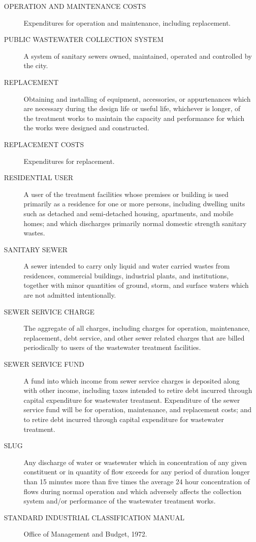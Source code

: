 \begin{description}
\item[OPERATION AND MAINTENANCE COSTS] Expenditures for operation and maintenance, including replacement.
\item[PUBLIC WASTEWATER COLLECTION SYSTEM] A system of sanitary sewers owned, maintained, operated and controlled by the city.
\item[REPLACEMENT] Obtaining and installing of equipment, accessories, or appurtenances which are necessary during the design life or useful life, whichever is longer, of the treatment works to maintain the capacity and performance for which the works were designed and constructed.
\item[REPLACEMENT COSTS] Expenditures for replacement.
\item[RESIDENTIAL USER] A user of the treatment facilities whose premises or building is used primarily as a residence for one or more persons, including dwelling units such as detached and semi-detached housing, apartments, and mobile homes; and which discharges primarily normal domestic strength sanitary wastes.
\item[SANITARY SEWER] A sewer intended to carry only liquid and water carried wastes from residences, commercial buildings, industrial plants, and institutions, together with minor quantities of ground, storm, and surface waters which are not admitted intentionally.
\item[SEWER SERVICE CHARGE] The aggregate of all charges, including charges for operation, maintenance, replacement, debt service, and other sewer related charges that are billed periodically to users of the wastewater treatment facilities.
\item[SEWER SERVICE FUND] A fund into which income from sewer service charges is deposited along with other income, including taxes intended to retire debt incurred through capital expenditure for wastewater treatment.  Expenditure of the sewer service fund will be for operation, maintenance, and replacement costs; and to retire debt incurred through capital expenditure for wastewater treatment.
\item[SLUG] Any discharge of water or wastewater which in concentration of any given constituent or in quantity of flow exceeds for any period of duration longer than 15 minutes more than five times the average 24 hour concentration of flows during normal operation and which adversely affects the collection system and/or performance of the wastewater treatment works.
\item[STANDARD INDUSTRIAL CLASSIFICATION MANUAL] Office of Management and Budget, 1972.

\end{description}
